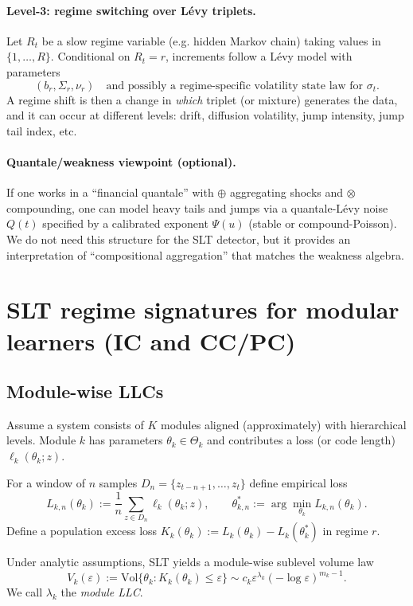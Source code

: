 \documentclass[11pt]{article}
\newcommand{\Vol}{\mathrm{Vol}}
\begin{document}
\paragraph{Level-3: regime switching over L\'evy triplets.}
Let $R_t$ be a slow regime variable (e.g. hidden Markov chain) taking values in $\{1,\dots,R\}$.
Conditional on $R_t=r$, increments follow a L\'evy model with parameters
\[
(b_r,\Sigma_r,\nu_r)\quad\text{and possibly a regime-specific volatility state law for }\sigma_t.
\]
A regime shift is then a change in \emph{which} triplet (or mixture) generates the data, and it can occur at
different levels: drift, diffusion volatility, jump intensity, jump tail index, etc.

\paragraph{Quantale/weakness viewpoint (optional).}
If one works in a ``financial quantale'' with $\oplus$ aggregating shocks and $\otimes$ compounding,
one can model heavy tails and jumps via a quantale-L\'evy noise $Q(t)$ specified by a calibrated
exponent $\Psi(u)$ (stable or compound-Poisson). We do not need this structure for the SLT detector,
but it provides an interpretation of ``compositional aggregation'' that matches the weakness algebra.

\section{SLT regime signatures for modular learners (IC and CC/PC)}
\subsection{Module-wise LLCs}
Assume a system consists of $K$ modules aligned (approximately) with hierarchical levels.
Module $k$ has parameters $\theta_k \in \Theta_k$ and contributes a loss (or code length) $\ell_k(\theta_k; z)$.

For a window of $n$ samples $D_n=\{z_{t-n+1},\dots,z_t\}$ define empirical loss
\[
L_{k,n}(\theta_k) := \frac{1}{n}\sum_{z \in D_n} \ell_k(\theta_k; z),
\qquad
\theta^\ast_{k,n} := \arg\min_{\theta_k} L_{k,n}(\theta_k).
\]
Define a population excess loss $K_k(\theta_k) := L_k(\theta_k)-L_k(\theta_k^\ast)$ in regime $r$.

Under analytic assumptions, SLT yields a module-wise sublevel volume law
\[
V_k(\varepsilon) := \Vol\{\theta_k : K_k(\theta_k) \le \varepsilon\}
\sim c_k \varepsilon^{\lambda_k}(-\log\varepsilon)^{m_k-1}.
\]
We call $\lambda_k$ the \emph{module LLC}.
\end{document}

